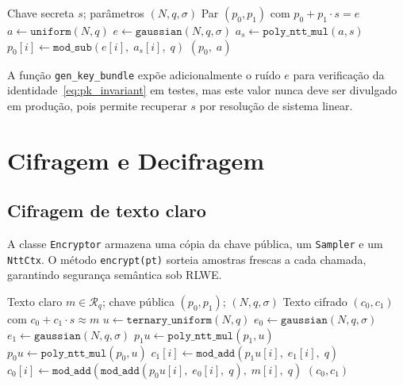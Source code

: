 \documentclass[11pt,a4paper]{report}
\newcommand{\Rq}{\mathcal{R}_q}
\begin{document}
\begin{algorithm}[ht]
\caption{\texttt{gen\_public\_key}: geração da chave pública RLWE}
\label{alg:keygen}
\begin{algorithmic}[1]
\Require Chave secreta $s$;\; parâmetros $(N, q, \sigma)$
\Ensure Par $(p_0, p_1)$ com $p_0 + p_1 \cdot s = e$
\State $a \gets \texttt{uniform}(N, q)$
  \Comment{$p_1 = a$: polinômio uniforme em $\Rq$}
\State $e \gets \texttt{gaussian}(N, q, \sigma)$
\State $a_s \gets \texttt{poly\_ntt\_mul}(a, s)$
  \State $p_0[i] \gets \texttt{mod\_sub}(e[i],\; a_s[i],\; q)$
\EndFor
\State \Return $(p_0,\; a)$
\end{algorithmic}
\end{algorithm}

A função \texttt{gen\_key\_bundle} expõe adicionalmente o ruído $e$ para verificação
da identidade~\eqref{eq:pk_invariant} em testes, mas este valor nunca deve ser
divulgado em produção, pois permite recuperar $s$ por resolução de sistema linear.

\chapter{Cifragem e Decifragem}
\label{cap:enc_dec}

\section{Cifragem de texto claro}
\label{sec:encrypt}

A classe \texttt{Encryptor} armazena uma cópia da chave pública, um \texttt{Sampler} e
um \texttt{NttCtx}. O método \texttt{encrypt(pt)} sorteia amostras frescas a cada
chamada, garantindo segurança semântica sob RLWE.

\begin{algorithm}[ht]
\caption{\texttt{encrypt}: cifragem de texto claro no esquema CKKS}
\label{alg:encrypt}
\begin{algorithmic}[1]
\Require Texto claro $m \in \Rq$;\; chave pública $(p_0, p_1)$;\; $(N, q, \sigma)$
\Ensure Texto cifrado $(c_0, c_1)$ com $c_0 + c_1 \cdot s \approx m$
\State $u  \gets \texttt{ternary\_uniform}(N, q)$
\State $e_0 \gets \texttt{gaussian}(N, q, \sigma)$
\State $e_1 \gets \texttt{gaussian}(N, q, \sigma)$
\State $p_1 u \gets \texttt{poly\_ntt\_mul}(p_1, u)$
\State $p_0 u \gets \texttt{poly\_ntt\_mul}(p_0, u)$
  \State $c_1[i] \gets \texttt{mod\_add}(p_1 u[i],\; e_1[i],\; q)$
\EndFor
{}
  \State $c_0[i] \gets \texttt{mod\_add}(\texttt{mod\_add}(p_0 u[i],\; e_0[i],\; q),\; m[i],\; q)$
\EndFor
\State \Return $(c_0, c_1)$
\end{algorithmic}
\end{algorithm}
\end{document}
